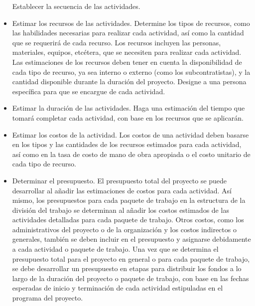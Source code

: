 \begin{itemize}
 

Establecer la secuencia de las actividades. 

 

\item Estimar los recursos de las actividades. Determine los tipos de recursos, como las habilidades necesarias para realizar cada actividad, así como la cantidad que se requerirá de cada recurso. Los recursos incluyen las personas, materiales, equipos, etcétera, que se necesiten para realizar cada actividad. Las estimaciones de los recursos deben tener en cuenta la disponibilidad de cada tipo de recurso, ya sea interno o externo (como los subcontratistas), y la cantidad disponible durante la duración del proyecto. Designe a una persona específica para que se encargue de cada actividad. 

 

\item Estimar la duración de las actividades. Haga una estimación del tiempo que tomará completar cada actividad, con base en los recursos que se aplicarán. 

 

\item Estimar los costos de la actividad. Los costos de una actividad deben basarse en los tipos y las cantidades de los recursos estimados para cada actividad, así como en la tasa de costo de mano de obra apropiada o el costo unitario de cada tipo de recurso. 

 

\item Determinar el presupuesto. El presupuesto total del proyecto se puede desarrollar al añadir las estimaciones de costos para cada actividad. Así mismo, los presupuestos para cada paquete de trabajo en la estructura de la división del trabajo se determinan al añadir los costos estimados de las actividades detalladas para cada paquete de trabajo. Otros costos, como los administrativos del proyecto o de la organización y los costos indirectos o generales, también se deben incluir en el presupuesto y asignarse debidamente a cada actividad o paquete de trabajo. Una vez que se determina el presupuesto total para el proyecto en general o para cada paquete de trabajo, se debe desarrollar un presupuesto en etapas para distribuir los fondos a lo largo de la duración del proyecto o paquete de trabajo, con base en las fechas esperadas de inicio y terminación de cada actividad estipuladas en el programa del proyecto.\cite{PMBOK}
\end{itemize}
